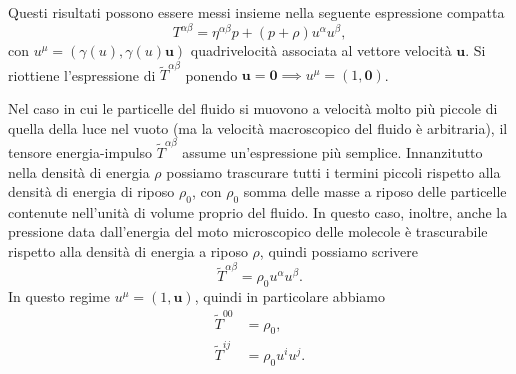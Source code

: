 Questi risultati possono essere messi insieme nella seguente espressione
compatta
\begin{equation}
  T^{\alpha\beta} = \eta^{\alpha\beta}p + (p + \rho)u^{\alpha}u^{\beta},
\end{equation}
con $u^{\mu} = (\gamma(u), \gamma(u) \bm{u})$ quadrivelocità associata al
vettore velocità $\bm{u}$.  Si riottiene l'espressione di
$\tilde T^{\alpha\beta}$ ponendo
$\bm{u} = \bm{0} \implies u^{\mu} = (1, \bm{0})$.

Nel caso in cui le particelle del fluido si muovono a velocità molto più piccole
di quella della luce nel vuoto (ma la velocità macroscopico del fluido è
arbitraria), il tensore energia-impulso $\tilde T^{\alpha\beta}$ assume
un'espressione più semplice.  Innanzitutto nella densità di energia $\rho$
possiamo trascurare tutti i termini piccoli rispetto alla densità di energia di
riposo $\rho_{0}$, con $\rho_{0}$ somma delle masse a riposo delle particelle
contenute nell'unità di volume proprio del fluido.  In questo caso, inoltre,
anche la pressione data dall'energia del moto microscopico delle molecole è
trascurabile rispetto alla densità di energia a riposo $\rho$, quindi possiamo
scrivere
\begin{equation}
  \tilde T^{\alpha\beta} = \rho_{0} u^{\alpha} u^{\beta}.
\end{equation}
In questo regime $u^{\mu}= (1, \bm{u})$, quindi in particolare abbiamo
\begin{subequations}
  \begin{align}
    \tilde T^{00} &= \rho_{0}, \\
    \tilde T^{ij} &= \rho_{0} u^{i} u^{j}.
  \end{align}
\end{subequations}


